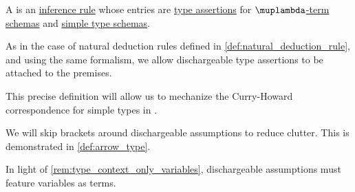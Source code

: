\begin{definition}\label{def:simple_typing_rule}\mimprovised
  A  is an \hyperref[def:inference_rule]{inference rule} whose entries are \hyperref[def:type_assertion]{type assertions} for \hyperref[def:lambda_term_schema]{\( \muplambda \)-term schemas} and \hyperref[def:simple_type_schema]{simple type schemas}.

  As in the case of natural deduction rules defined in \cref{def:natural_deduction_rule}, and using the same formalism, we allow dischargeable type assertions to be attached to the premises.
\end{definition}
\begin{comments}
  \item This precise definition will allow us to mechanize the Curry-Howard correspondence for simple types in .

  \item We will skip brackets around dischargeable assumptions to reduce clutter. This is demonstrated in \cref{def:arrow_type}.

  \item In light of \cref{rem:type_context_only_variables}, dischargeable assumptions must feature variables as terms.
\end{comments}

